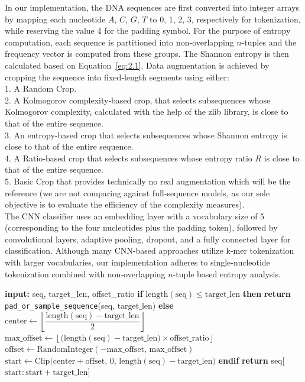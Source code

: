 \documentclass{article}
\theoremstyle{remark}
\begin{document}
In our implementation, the DNA sequences are first converted into integer arrays by mapping each nucleotide \(A\), \(C\), \(G\), \(T\) to 0, 1, 2, 3, respectively for tokenization, while reserving the value 4 for the padding symbol. For the purpose of entropy computation, each sequence is partitioned into non‑overlapping \(n\)-tuples and the frequency vector is computed from these groups. The Shannon entropy is then calculated based on Equation~\eqref{eq:2.1}. Data augmentation is achieved by cropping the sequence into fixed‑length segments using either:\\
1. A Random Crop.\\
2. A Kolmogorov complexity‑based crop, that selects subsequences whose Kolmogorov complexity, calculated with the help of the zlib library, is close to that of the entire sequence.\\
3. An entropy‑based crop that selects subsequences whose Shannon entropy is close to that of the entire sequence.\\
4. A Ratio‑based crop that selects subsequences whose entropy ratio \(R\) is close to that of the entire sequence. \\
5. Basic Crop that provides technically no real augmentation which will be the reference (we are not comparing against full‐sequence models, as our sole objective is to evaluate the efficiency of the complexity measures).\\
The CNN classifier uses an embedding layer with a vocabulary size of 5 (corresponding to the four nucleotides plus the padding token), followed by convolutional layers, adaptive pooling, dropout, and a fully connected layer for classification. Although many CNN‑based approaches utilize k‑mer tokenization\cite{ref33} with larger vocabularies, our implementation adheres to single‑nucleotide tokenization combined with non‑overlapping \(n\)-tuple based entropy analysis.

\begin{algorithm}[H]
\caption{Random Crop}
\begin{algorithmic}[1]
    \State \textbf{input:} seq, target\_len, offset\_ratio
    \State \textbf{if} $\mathrm{length}(\mathrm{seq}) \leq \mathrm{target\_len}$ \textbf{then}
        \State \quad \textbf{return} \texttt{pad\_or\_sample\_sequence}(seq, $\mathrm{target\_len}$)
    \State \textbf{else}
        \State \quad $\mathrm{center} \gets \left\lfloor \dfrac{\mathrm{length}(\mathrm{seq}) - \mathrm{target\_len}}{2} \right\rfloor$
        \State \quad $\mathrm{max\_offset} \gets \left\lfloor \bigl(\mathrm{length}(\mathrm{seq}) - \mathrm{target\_len}\bigr)\times \mathrm{offset\_ratio} \right\rfloor$
        \State \quad $\mathrm{offset} \gets \mathrm{RandomInteger}(-\mathrm{max\_offset},\, \mathrm{max\_offset})$
        \State \quad $\mathrm{start} \gets \mathrm{Clip}\bigl(\mathrm{center} + \mathrm{offset},\, 0,\, \mathrm{length}(\mathrm{seq}) - \mathrm{target\_len}\bigr)$
    \State \textbf{endif}
    \State \textbf{return} seq[$\mathrm{start} : \mathrm{start} + \mathrm{target\_len}$]
\EndProcedure
\end{algorithmic}
\end{algorithm}
\end{document}
